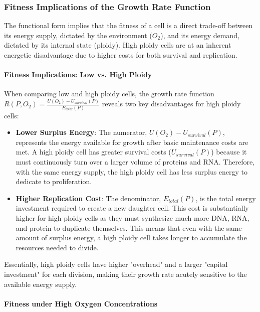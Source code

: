 \documentclass{article}
\begin{document}
\subsubsection*{Fitness Implications of the Growth Rate Function}

The functional form implies that the fitness of a cell is a direct trade-off between its energy supply, dictated by the environment ($O_2$), and its energy demand, dictated by its internal state (ploidy). High ploidy cells are at an inherent energetic disadvantage due to higher costs for both survival and replication.

\paragraph{Fitness Implications: Low vs. High Ploidy}

When comparing low and high ploidy cells, the growth rate function $R(P, O_2) = \frac{U(O_2) - U_{survival}(P)}{E_{total}(P)}$ reveals two key disadvantages for high ploidy cells:

\begin{itemize}
    \item \textbf{Lower Surplus Energy}: The numerator, $U(O_2) - U_{survival}(P)$, represents the energy available for growth after basic maintenance costs are met. A high ploidy cell has greater survival costs ($U_{survival}(P)$) because it must continuously turn over a larger volume of proteins and RNA. Therefore, with the same energy supply, the high ploidy cell has less surplus energy to dedicate to proliferation.

    \item \textbf{Higher Replication Cost}: The denominator, $E_{total}(P)$, is the total energy investment required to create a new daughter cell. This cost is substantially higher for high ploidy cells as they must synthesize much more DNA, RNA, and protein to duplicate themselves. This means that even with the same amount of surplus energy, a high ploidy cell takes longer to accumulate the resources needed to divide.
\end{itemize}

Essentially, high ploidy cells have higher "overhead" and a larger "capital investment" for each division, making their growth rate acutely sensitive to the available energy supply.

\paragraph{Fitness under High Oxygen Concentrations}
\end{document}
